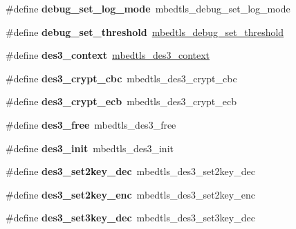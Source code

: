 \begin{DoxyCompactItemize}
\#define {\bfseries debug\+\_\+set\+\_\+log\+\_\+mode}~mbedtls\+\_\+debug\+\_\+set\+\_\+log\+\_\+mode
\item 
\mbox{\label{compat-1_83_8h_a4d50121c1043e036594c4c59e945123d}} 
\#define {\bfseries debug\+\_\+set\+\_\+threshold}~\mbox{\hyperlink{debug_8h_a6629362e96b43725ace95c8ff01d9985}{mbedtls\+\_\+debug\+\_\+set\+\_\+threshold}}
\item 
\mbox{\label{compat-1_83_8h_a9a7235f5c947e538c86edecc590f2067}} 
\#define {\bfseries des3\+\_\+context}~\mbox{\hyperlink{structmbedtls__des3__context}{mbedtls\+\_\+des3\+\_\+context}}
\item 
\mbox{\label{compat-1_83_8h_a905a79f04e3e8a88f565feb6073462c1}} 
\#define {\bfseries des3\+\_\+crypt\+\_\+cbc}~mbedtls\+\_\+des3\+\_\+crypt\+\_\+cbc
\item 
\mbox{\label{compat-1_83_8h_ab63ba432feb0601d9fe303fefcae9ee3}} 
\#define {\bfseries des3\+\_\+crypt\+\_\+ecb}~mbedtls\+\_\+des3\+\_\+crypt\+\_\+ecb
\item 
\mbox{\label{compat-1_83_8h_aca7694c5ac76acaae82e27bd1226f2f5}} 
\#define {\bfseries des3\+\_\+free}~mbedtls\+\_\+des3\+\_\+free
\item 
\mbox{\label{compat-1_83_8h_a461d05406a0e901cb0e59d6382ab6ba5}} 
\#define {\bfseries des3\+\_\+init}~mbedtls\+\_\+des3\+\_\+init
\item 
\mbox{\label{compat-1_83_8h_ab48710daa859edb855ea67f24a3eb871}} 
\#define {\bfseries des3\+\_\+set2key\+\_\+dec}~mbedtls\+\_\+des3\+\_\+set2key\+\_\+dec
\item 
\mbox{\label{compat-1_83_8h_ae1ad32c86d9e279451aa15ee53998a86}} 
\#define {\bfseries des3\+\_\+set2key\+\_\+enc}~mbedtls\+\_\+des3\+\_\+set2key\+\_\+enc
\item 
\mbox{\label{compat-1_83_8h_abc6dbd679e0065bfd0be94202a69e0d8}} 
\#define {\bfseries des3\+\_\+set3key\+\_\+dec}~mbedtls\+\_\+des3\+\_\+set3key\+\_\+dec
\item 
\mbox{\label{compat-1_83_8h_ad61273f112db564d20a03c01d2c0f74a}} 

\end{DoxyCompactItemize}
